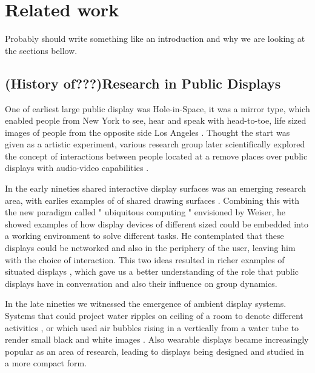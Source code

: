 \section{Related work}
Probably should write something like an introduction and why we are looking at the sections bellow.
\subsection{(History of???)Research in Public Displays}
One of earliest large public display was Hole-in-Space, it was a mirror type, which enabled people from New York to see, hear and speak with head-to-toe, life sized images of people from the opposite side Los Angeles \cite{Galloway:1980}.
Thought the start was given as a artistic experiment, various research group later scientifically explored the concept of interactions between people located at a remove places over public displays with audio-video capabilities \cite{Fish:1990,Gaver:1992,Bly:1993}.

In the early nineties shared interactive display surfaces was an emerging research area, with earlies examples of of shared drawing surfaces \cite{Bly:1990, Ishii:1992}. Combining this with the new paradigm called " ubiquitous computing " envisioned by Weiser, he showed examples of how  display devices of different sized could be embedded into a working environment  to solve different tasks. He contemplated that these displays could be networked and also in the periphery of the user, leaving him with the choice of interaction. \cite{Weiser:1991} This two ideas resulted in  richer examples of situated displays \cite{Streitz:1999,Snowdon:2002}, which gave us a better understanding of the role that public displays have in conversation and also their influence on group dynamics.

In the late nineties we witnessed the emergence of ambient display systems. Systems that could project water ripples on ceiling of a room to denote different activities \cite{Ishii:1998}, or which used air bubbles rising in a vertically from a water tube to render small black and white images \cite{Heiner:1999}. Also wearable displays became increasingly popular as an area of research, leading to displays being designed and studied in a more compact form\cite{Borovoy:1999,Rhodes:1997,Falk:1999}. 

